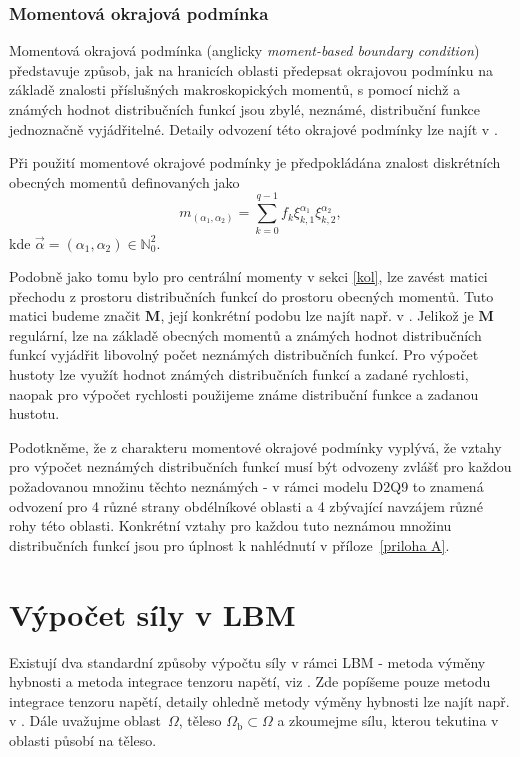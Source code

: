 \subsubsection{Momentová okrajová podmínka}\label{moment based bc}

Momentová okrajová podmínka (anglicky \textit{moment-based boundary condition}) představuje způsob, jak na hranicích oblasti předepsat okrajovou podmínku na základě znalosti příslušných makroskopických momentů, s pomocí nichž a známých hodnot distribučních funkcí jsou zbylé, neznámé, distribuční funkce jednoznačně vyjádřitelné. Detaily odvození této okrajové podmínky lze najít v \cite{PE}.

Při použití momentové okrajové podmínky je předpokládána znalost diskrétních obecných momentů definovaných jako
\begin{equation}\label{eq:raw moments}
m_{(\alpha_{1}, \alpha_{2})} = \sum_{k=0}^{q-1} f_{k} \xi^{\alpha_{1}}_{k,1} \xi^{\alpha_{2}}_{k,2},
\end{equation}
kde $ \vec{\alpha} = (\alpha_{1}, \alpha_{2}) \in \mathbb{N}^2_{0}$.

Podobně jako tomu bylo pro centrální momenty v sekci \ref{kol}, lze zavést matici přechodu z prostoru distribučních funkcí do prostoru obecných momentů. Tuto matici budeme značit $ \mathbf{M} $, její konkrétní podobu lze najít např. v \cite{LBMAT}. Jelikož je $ \mathbf{M} $ regulární, lze na základě obecných momentů a známých hodnot distribučních funkcí vyjádřit libovolný počet neznámých distribučních funkcí. Pro výpočet hustoty lze využít hodnot známých distribučních funkcí a zadané rychlosti, naopak pro výpočet rychlosti použijeme známe distribuční funkce a zadanou hustotu.

Podotkněme, že z charakteru momentové okrajové podmínky vyplývá, že vztahy pro výpočet neznámých distribučních funkcí musí být odvozeny zvlášť pro každou požadovanou množinu těchto neznámých - v rámci modelu D2Q9 to znamená odvození pro 4 různé strany obdélníkové oblasti a 4 zbývající navzájem různé rohy této oblasti. Konkrétní vztahy pro každou tuto neznámou množinu distribučních funkcí 
jsou pro úplnost k nahlédnutí v příloze~\ref{priloha A}.


\section{Výpočet síly v LBM}\label{vypocet sily v LBM}

Existují dva standardní způsoby výpočtu síly v rámci LBM - metoda výměny hybnosti a metoda integrace tenzoru napětí, viz \cite{NASA}. Zde popíšeme pouze metodu integrace tenzoru napětí, detaily ohledně metody výměny hybnosti lze najít např. v \cite{NASA}. Dále uvažujme oblast~$ \Omega $, těleso $ \Omega_{\mathrm{b}} \subset \Omega $ a zkoumejme sílu, kterou tekutina v oblasti působí na těleso.

